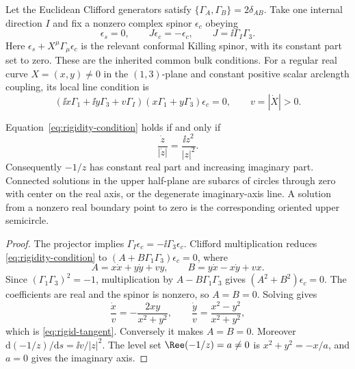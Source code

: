Let the Euclidean Clifford generators satisfy
$\{\Gamma_A,\Gamma_B\}=2\delta_{AB}$. Take one internal direction $I$
and fix a nonzero complex spinor $\epsilon_c$ obeying
\begin{equation}\label{eq:inherited-charge}
 \epsilon_s=0,\qquad J\epsilon_c=-\epsilon_c,
 \qquad J=\ii\Gamma_I\Gamma_3.
\end{equation}
Here $\epsilon_s+X^\mu\Gamma_\mu\epsilon_c$ is the relevant conformal
Killing spinor, with its constant part set to zero. These are the
inherited common bulk conditions. For a regular real curve
$X=(x,y)\ne0$ in the $(1,3)$-plane and constant positive scalar
arclength coupling, its local line condition is
\begin{equation}\label{eq:rigidity-condition}
 (\ii\dot x\Gamma_1+\ii\dot y\Gamma_3+v\Gamma_I)
 (x\Gamma_1+y\Gamma_3)\epsilon_c=0,
 \qquad v=|\dot X|>0.
\end{equation}

\begin{proposition}\label{prop:rigidity}
Equation~\eqref{eq:rigidity-condition} holds if and only if
\begin{equation}\label{eq:rigid-tangent}
 \frac{\dot z}{|\dot z|}=\frac{\ii z^2}{|z|^2}.
\end{equation}
Consequently $-1/z$ has constant real part and increasing imaginary
part. Connected solutions in the upper half-plane are subarcs of
circles through zero with center on the real axis, or the degenerate
imaginary-axis line. A solution from a nonzero real boundary point to
zero is the corresponding oriented upper semicircle.
\end{proposition}
\begin{proof}
The projector implies $\Gamma_I\epsilon_c=-\ii\Gamma_3\epsilon_c$.
Clifford multiplication reduces \eqref{eq:rigidity-condition} to
$(A+B\Gamma_1\Gamma_3)\epsilon_c=0$, where
\begin{equation}
 A=x\dot x+y\dot y+vy,\qquad B=y\dot x-x\dot y+vx.
\end{equation}
Since $(\Gamma_1\Gamma_3)^2=-1$, multiplication by
$A-B\Gamma_1\Gamma_3$ gives $(A^2+B^2)\epsilon_c=0$.
The coefficients are real and the spinor is nonzero, so $A=B=0$.
Solving gives
\begin{equation}
 \frac{\dot x}{v}=-\frac{2xy}{x^2+y^2},\qquad
 \frac{\dot y}{v}=\frac{x^2-y^2}{x^2+y^2},
\end{equation}
which is \eqref{eq:rigid-tangent}. Conversely it makes $A=B=0$.
Moreover $\mathrm d(-1/z)/\mathrm ds=\ii v/|z|^2$.
The level set $\Ree(-1/z)=a\ne0$ is
$x^2+y^2=-x/a$, and $a=0$ gives the imaginary axis.
\end{proof}

